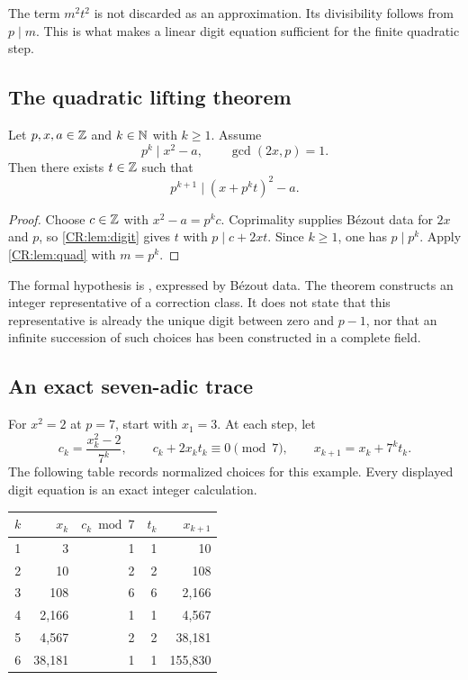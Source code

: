 The term $m^2t^2$ is not discarded as an approximation. Its divisibility follows from $p\mid m$. This is what makes a linear digit equation sufficient for the finite quadratic step.

\subsection{The quadratic lifting theorem}
\begin{CRtheorem}\label{CR:thm:hensel}
Let $p,x,a\in\mathbb{Z}$ and $k\in\mathbb{N}$ with $k\geq1$. Assume
\[
p^k\mid x^2-a,\qquad \gcd(2x,p)=1.
\]
Then there exists $t\in\mathbb{Z}$ such that
\begin{equation}\label{CR:eq:hensel}
p^{k+1}\mid (x+p^kt)^2-a.
\end{equation}
\end{CRtheorem}
\begin{proof}
Choose $c\in\mathbb{Z}$ with $x^2-a=p^kc$. Coprimality supplies B\'ezout data for $2x$ and $p$, so \cref{CR:lem:digit} gives $t$ with $p\mid c+2xt$. Since $k\geq1$, one has $p\mid p^k$. Apply \cref{CR:lem:quad} with $m=p^k$.
\end{proof}

The formal hypothesis is , expressed by B\'ezout data. The theorem constructs an integer representative of a correction class. It does not state that this representative is already the unique digit between zero and $p-1$, nor that an infinite succession of such choices has been constructed in a complete field.

\subsection{An exact seven-adic trace}\label{CR:sec:trace}
For $x^2=2$ at $p=7$, start with $x_1=3$. At each step, let
\[
c_k=\frac{x_k^2-2}{7^k},\qquad
c_k+2x_kt_k\equiv0\pmod7,\qquad
x_{k+1}=x_k+7^kt_k.
\]
The following table records normalized choices for this example. Every displayed digit equation is an exact integer calculation.

\begin{center}
\begin{tabular}{@{}rrrrr@{}}
\toprule
$k$ & $x_k$ & $c_k\bmod7$ & $t_k$ & $x_{k+1}$\\
\midrule
1 & 3 & 1 & 1 & 10\\
2 & 10 & 2 & 2 & 108\\
3 & 108 & 6 & 6 & 2,166\\
4 & 2,166 & 1 & 1 & 4,567\\
5 & 4,567 & 2 & 2 & 38,181\\
6 & 38,181 & 1 & 1 & 155,830\\
\bottomrule
\end{tabular}
\end{center}

